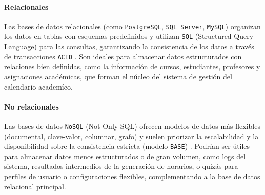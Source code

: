 \paragraph{Relacionales}
Las bases de datos relacionales (como \texttt{PostgreSQL}, \texttt{SQL Server}, \texttt{MySQL}) organizan los datos en tablas con esquemas predefinidos y utilizan \texttt{SQL} (Structured Query Language) para las consultas, garantizando la consistencia de los datos a través de transacciones \texttt{ACID} \parencite{Date2003}.
Son ideales para almacenar datos estructurados con relaciones bien definidas, como la información de cursos, estudiantes, profesores y asignaciones académicas, que forman el núcleo del sistema de gestión del calendario academíco.

\paragraph{No relacionales}
Las bases de datos \texttt{NoSQL} (Not Only SQL) ofrecen modelos de datos más flexibles (documental, clave-valor, columnar, grafo) y suelen priorizar la escalabilidad y la disponibilidad sobre la consistencia estricta (modelo \texttt{BASE}) \parencite{SadalegeFowler2012}.
Podrían ser útiles para almacenar datos menos estructurados o de gran volumen, como logs del sistema, resultados intermedios de la generación de horarios, o quizás para perfiles de usuario o configuraciones flexibles, complementando a la base de datos relacional principal.

